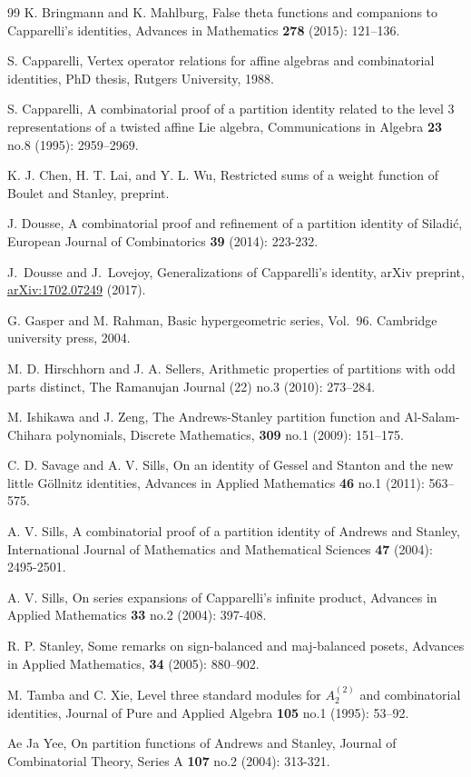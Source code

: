 \documentclass[12pt]{amsart}
\numberwithin{equation}{section}
\theoremstyle{plain}
\theoremstyle{definition}
\begin{document}
\begin{thebibliography}{99}
 K. Bringmann and K. Mahlburg, False theta functions and companions to Capparelli's identities, Advances in Mathematics {\bf 278} (2015): 121--136.

 S. Capparelli, Vertex operator relations for affine algebras and combinatorial identities, PhD thesis, Rutgers University, 1988.

 S. Capparelli, A combinatorial proof of a partition identity related to the level 3 representations of a twisted affine Lie algebra, Communications in Algebra {\bf 23} no.8 (1995): 2959--2969.

 K. J. Chen, H. T. Lai, and Y. L. Wu, Restricted sums of a weight function of Boulet and Stanley, preprint.

 J. Dousse, A combinatorial proof and refinement of a partition identity of Siladi\'{c}, European Journal of Combinatorics {\bf 39} (2014): 223-232.

J.~Dousse and J.~Lovejoy, Generalizations of Capparelli's identity, arXiv preprint, \href{http://arxiv.org/abs/1702.07249}{arXiv:1702.07249} (2017).

 G. Gasper and M. Rahman, Basic hypergeometric series, Vol.~96. Cambridge university press, 2004.

 M. D. Hirschhorn and J. A. Sellers, Arithmetic properties of partitions with odd parts distinct, The Ramanujan Journal (22) no.3 (2010): 273--284.

 M. Ishikawa and J. Zeng, 
The Andrews-Stanley partition function and Al-Salam-Chihara polynomials, 
Discrete Mathematics, {\bf309} no.1 (2009): 151--175. 



 C. D. Savage and A. V. Sills, On an identity of Gessel and Stanton and the new little G\"{o}llnitz identities, Advances in Applied Mathematics {\bf 46} no.1 (2011): 563--575.

 A. V. Sills, A combinatorial proof of a partition identity of Andrews and Stanley, International Journal of Mathematics and Mathematical Sciences {\bf 47} (2004): 2495-2501.

 A. V. Sills, On series expansions of Capparelli's infinite product, Advances in Applied Mathematics {\bf 33} no.2 (2004): 397-408.



 R. P. Stanley, Some remarks on sign-balanced and maj-balanced posets, Advances in Applied Mathematics, {\bf34} (2005): 880--902.

 M. Tamba and C. Xie, Level three standard modules for $A_2^{(2)}$ and combinatorial identities, Journal of Pure and Applied Algebra {\bf 105} no.1 (1995): 53--92.

 Ae Ja Yee, On partition functions of Andrews and Stanley, Journal of Combinatorial Theory, Series A {\bf 107} no.2 (2004): 313-321. 
 

\end{thebibliography}
\end{document}
